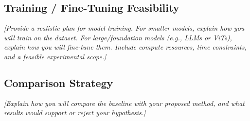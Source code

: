 \documentclass[11pt]{article}
\newcommand{\prompt}[1]{\textcolor{promptgray}{\textit{[#1]}}}
\begin{document}
\subsection{Training / Fine-Tuning Feasibility}
\prompt{Provide a realistic plan for model training. For smaller models,
explain how you will train on the dataset. For large/foundation models
(e.g., LLMs or ViTs), explain how you will fine-tune them. Include
compute resources, time constraints, and a feasible experimental scope.}

\subsection{Comparison Strategy}
\prompt{Explain how you will compare the baseline with your proposed
method, and what results would support or reject your hypothesis.}

% 
% 
\end{document}
